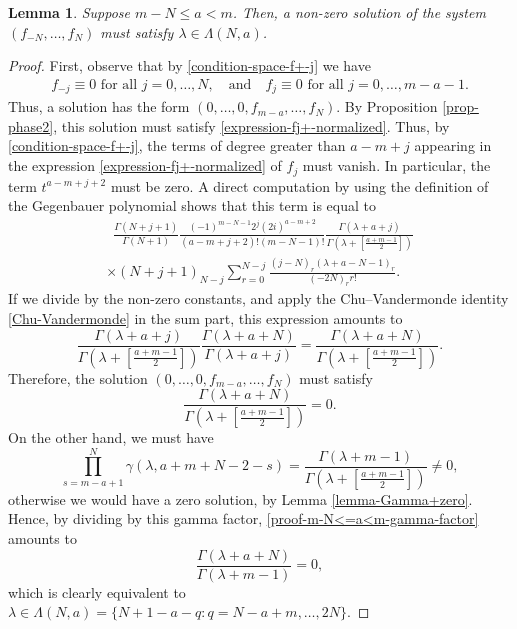 \documentclass[12pt, pdflatex, a4paper]{article}
\theoremstyle{plain}
\newtheorem{lemma}[thm]{Lemma}
\theoremstyle{definition}
\begin{document}
\begin{lemma}\label{lemma-case-m-N<=a<m} Suppose $m-N \leq a < m$. Then, a non-zero solution of the system $(f_{-N}, \ldots, f_N)$ must satisfy $\lambda \in \Lambda(N,a)$.
\end{lemma}
\begin{proof}
First, observe that by \eqref{condition-space-f+-j} we have
\begin{align*}
f_{-j} \equiv 0 \text{ for all } j=0, \ldots, N, \quad \text{and} \quad f_{j} \equiv 0 \text{ for all } j = 0, \ldots, m-a-1.
\end{align*}
Thus, a solution has the form $(0, \ldots,0, f_{m-a}, \dots, f_N)$. By Proposition \ref{prop-phase2}, this solution must satisfy \eqref{expression-fj+-normalized}. Thus, by \eqref{condition-space-f+-j}, the terms of degree greater than $a-m+j$ appearing in the expression \eqref{expression-fj+-normalized} of $f_j$ must vanish. In particular, the term $t^{a-m+j+2}$ must be zero. A direct computation by using the definition of the Gegenbauer polynomial shows that this term is equal to
\begin{align*}
\enspace \frac{\Gamma(N+j+1)}{\Gamma(N+1)}\frac{(-1)^{m-N-1}2^j(2i)^{a-m+2}}{(a-m+j+2)!(m-N-1)!}\frac{\Gamma\left(\lambda+a+j\right)}{\Gamma\left(\lambda+\left[\frac{a+m-1}{2}\right]\right)}\\
\times (N+j+1)_{N-j} \sum_{r=0}^{N-j}\frac{(j-N)_r(\lambda+a-N-1)_r}{(-2N)_r r!}. 
\end{align*}
If we divide by the non-zero constants, and apply the Chu--Vandermonde identity \eqref{Chu-Vandermonde} in the sum part, this expression amounts to
\begin{equation*}
\frac{\Gamma\left(\lambda+a+j\right)}{\Gamma\left(\lambda+\left[\frac{a+m-1}{2}\right]\right)} \frac{\Gamma\left(\lambda+a+N\right)}{\Gamma\left(\lambda+a+j\right)} = \frac{\Gamma\left(\lambda+a+N\right)}{\Gamma\left(\lambda+\left[\frac{a+m-1}{2}\right]\right)}.
\end{equation*}
Therefore, the solution $(0, \ldots,0, f_{m-a}, \dots, f_N)$ must satisfy
\begin{equation}\label{proof-m-N<=a<m-gamma-factor}
 \frac{\Gamma\left(\lambda+a+N\right)}{\Gamma\left(\lambda+\left[\frac{a+m-1}{2}\right]\right)} = 0.
\end{equation}
On the other hand, we must have
\begin{equation*}
\prod_{s=m-a+1}^{N}\gamma(\lambda, a+m+N-2-s) = \frac{\Gamma\left(\lambda + m-1\right)}{\Gamma\left(\lambda + \left[\frac{a+m-1}{2}\right]\right)} \neq 0,
\end{equation*}
otherwise we would have a zero solution, by Lemma \ref{lemma-Gamma+zero}. Hence, by dividing by this gamma factor, \eqref{proof-m-N<=a<m-gamma-factor} amounts to
\begin{equation*}
 \frac{\Gamma\left(\lambda+a+N\right)}{\Gamma\left(\lambda + m-1\right)} = 0,
\end{equation*}
which is clearly equivalent to $\lambda \in \Lambda(N,a) = \{N+1-a-q: q = N-a+m, \ldots, 2N\}$.
\end{proof}
\end{document}
